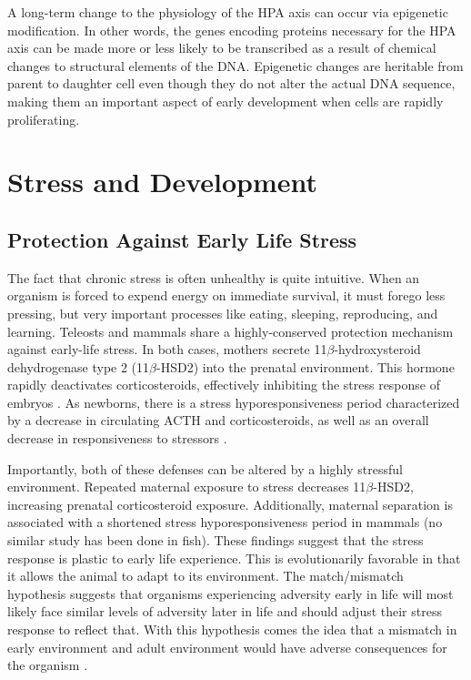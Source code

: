 \documentclass[12pt,twoside]{reedthesis}
\begin{document}
A long-term change to the physiology of the HPA axis can occur via epigenetic
modification. In other words, the genes encoding proteins necessary for the HPA
axis can be made more or less likely to be transcribed as a result of chemical
changes to structural elements of the DNA. Epigenetic changes are heritable from
parent to daughter cell
even though they do not alter the actual DNA sequence, making them an important aspect of early development when cells are rapidly proliferating. 

\section{Stress and Development}
\subsection{Protection Against Early Life Stress} 
The fact that chronic stress is often unhealthy is quite intuitive. When an
organism is forced to expend energy on immediate survival, it must forego less
pressing, but very important processes like eating, sleeping, reproducing, and
learning. Teleosts and mammals share a highly-conserved protection mechanism against
early-life stress. In both cases, mothers secrete 11$\beta$-hydroxysteroid
dehydrogenase type 2 (11$\beta$-HSD2) into the prenatal environment. This hormone rapidly deactivates corticosteroids, effectively
inhibiting the stress response of embryos \citep{van_bodegom_modulation_2017, faught_maternal_2016}. As
newborns, there is a stress hyporesponsiveness period characterized by a
decrease in circulating ACTH and corticosteroids, as well as an overall decrease
in responsiveness to stressors \citep{van_bodegom_modulation_2017, barry_ontogeny_1995}.

Importantly, both of these defenses can be altered by a highly stressful
environment. Repeated maternal exposure to stress decreases 11$\beta$-HSD2,
increasing prenatal corticosteroid exposure. Additionally, maternal separation is
associated with a shortened stress hyporesponsiveness period in mammals (no
similar study has been done in fish). These findings suggest that the stress
response is plastic to early life experience. This is
evolutionarily favorable in that it allows the animal to adapt to its
environment. The match/mismatch hypothesis suggests that organisms experiencing
adversity early in life will most likely face similar levels of adversity later
in life and should adjust their stress response to reflect that. With this
hypothesis comes the idea that a mismatch in early environment and adult
environment would have adverse consequences for the organism \citep{gluckman_early_2007}. 
\end{document}
